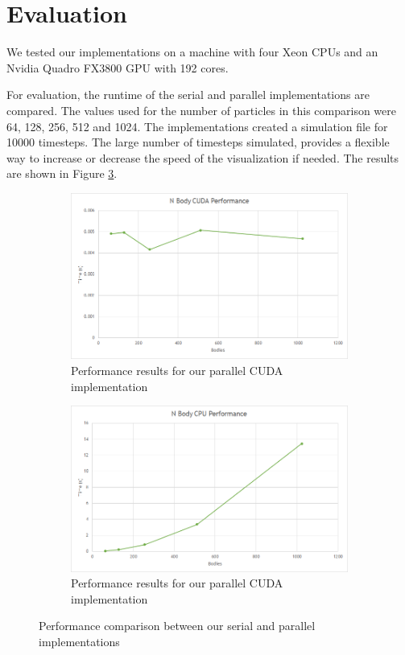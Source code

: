 \documentclass[10pt,a4paper]{article}
\begin{document}
	\section{Evaluation}
	We tested our implementations on a machine with four Xeon CPUs and an Nvidia Quadro FX3800 GPU with 192 cores. 
	
	For evaluation, the runtime of the serial and parallel implementations are compared. The values used for the number of particles in this comparison were 64, 128, 256, 512 and 1024. The implementations created a simulation file for 10000 timesteps. The large number of timesteps simulated, provides a flexible way to increase or decrease the speed of the visualization if needed. The results are shown in Figure \ref{perf}.
	\begin{figure}
		\centering
		\begin{subfigure}[b]{0.45\textwidth}
			\includegraphics[width=\textwidth]{nbody_cuda.png}
			\caption{Performance results for our parallel CUDA implementation}
			\label{nbody_cuda}
		\end{subfigure}
		\begin{subfigure}[b]{0.45\textwidth}
			\includegraphics[width=\textwidth]{nbody_cpu.png}
			\caption{Performance results for our parallel CUDA implementation}
			\label{nbody_cpu}
		\end{subfigure}
		\caption{Performance comparison between our serial and parallel implementations}
		\label{perf}
	\end{figure}
	\pagebreak
	
\end{document}
